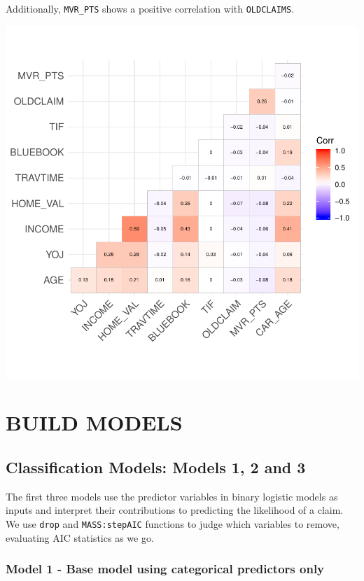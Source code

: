 \documentclass[]{article}
\begin{document}
Additionally, \texttt{MVR\_PTS} shows a positive correlation with
\texttt{OLDCLAIMS}.

\includegraphics{proj4_files/figure-latex/f10-1.pdf}

\newpage

\section{BUILD MODELS}\label{build-models}

\subsection{Classification Models: Models 1, 2 and
3}\label{classification-models-models-1-2-and-3}

The first three models use the predictor variables in binary logistic
models as inputs and interpret their contributions to predicting the
likelihood of a claim. We use \texttt{drop} and \texttt{MASS:stepAIC}
functions to judge which variables to remove, evaluating AIC statistics
as we go.

\subsubsection{Model 1 - Base model using categorical predictors
only}\label{model-1---base-model-using-categorical-predictors-only}
\end{document}
